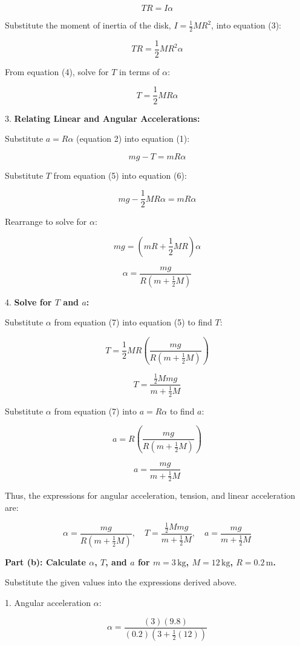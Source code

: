 \[
TR = I\alpha \tag{3}
\]

Substitute the moment of inertia of the disk, $I = \frac{1}{2}MR^2$, into equation (3):

\[
TR = \frac{1}{2}MR^2\alpha \tag{4}
\]

From equation (4), solve for $T$ in terms of $\alpha$:

\[
T = \frac{1}{2}MR\alpha \tag{5}
\]

3. \textbf{Relating Linear and Angular Accelerations:}

Substitute $a = R\alpha$ (equation 2) into equation (1):

\[
mg - T = mR\alpha \tag{6}
\]

Substitute $T$ from equation (5) into equation (6):

\[
mg - \frac{1}{2}MR\alpha = mR\alpha
\]

Rearrange to solve for $\alpha$:

\[
mg = \left(mR + \frac{1}{2}MR\right)\alpha
\]

\[
\alpha = \frac{mg}{R\left(m + \frac{1}{2}M\right)} \tag{7}
\]

4. \textbf{Solve for $T$ and $a$:}

Substitute $\alpha$ from equation (7) into equation (5) to find $T$:

\[
T = \frac{1}{2}MR\left(\frac{mg}{R\left(m + \frac{1}{2}M\right)}\right)
\]

\[
T = \frac{\frac{1}{2}Mmg}{m + \frac{1}{2}M} \tag{8}
\]

Substitute $\alpha$ from equation (7) into $a = R\alpha$ to find $a$:

\[
a = R\left(\frac{mg}{R\left(m + \frac{1}{2}M\right)}\right)
\]

\[
a = \frac{mg}{m + \frac{1}{2}M} \tag{9}
\]

Thus, the expressions for angular acceleration, tension, and linear acceleration are:

\[
\boxed{\alpha = \frac{mg}{R\left(m + \frac{1}{2}M\right)}, \quad T = \frac{\frac{1}{2}Mmg}{m + \frac{1}{2}M}, \quad a = \frac{mg}{m + \frac{1}{2}M}}
\]

\textbf{Part (b): Calculate $\alpha$, $T$, and $a$ for $m = 3\,\text{kg}$, $M = 12\,\text{kg}$, $R = 0.2\,\text{m}$.}

Substitute the given values into the expressions derived above.

1. Angular acceleration $\alpha$:

\[
\alpha = \frac{(3)(9.8)}{(0.2)\left(3 + \frac{1}{2}(12)\right)}
\]

